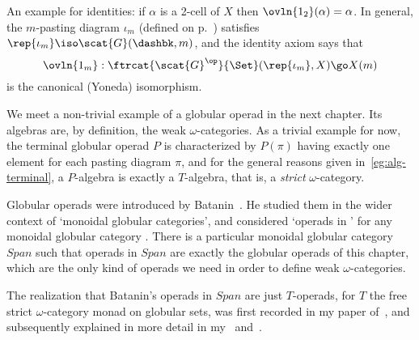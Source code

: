 An example for identities:%
%
%
if $\alpha$ is a 2-cell of $X$ then
$\ovln{1_2}(\alpha) = \alpha$.  In general, the $m$-pasting diagram
$\iota_m$ (defined on p.~\pageref{p:looking-single}) satisfies
$\rep{\iota_m} \iso \scat{G}(\dashbk, m)$, and the identity axiom says that
\[
\ovln{1_m}: \ftrcat{\scat{G}^\op}{\Set}(\rep{\iota_m},X) \go X(m)
\]
is the canonical (Yoneda) isomorphism.  

We meet a non-trivial example of a globular operad in the next chapter.
Its algebras are, by definition, the weak $\omega$-categories.  As a
trivial example for now, the terminal globular operad $P$ is characterized
by $P(\pi)$ having exactly one element for each pasting diagram $\pi$, and
for the general reasons given in~\ref{eg:alg-terminal}, a $P$-algebra is
exactly a $T$-algebra, that is, a \emph{strict}%
%
%
$\omega$-category.%
%
%
%
%



\begin{notes}

Globular operads were introduced by Batanin~\cite{BatMGC}.%
%
%
 He studied them
in the wider context of `monoidal%
%
%
globular categories', and considered `operads in ' for any monoidal
globular category .  There is a particular monoidal globular
category $\mathit{Span}$ such that operads in $\mathit{Span}$ are exactly
the globular operads of this chapter, which are the only kind of operads we
need in order to define weak $\omega$-categories.

The realization that Batanin's operads in $\mathit{Span}$ are just
$T$-operads, for $T$ the free strict $\omega$-category monad on globular
sets, was first recorded in my paper of~\cite{GOM}, and subsequently
explained in more detail in my~\cite{SHDCT} and~\cite{OHDCT}.

\end{notes}






